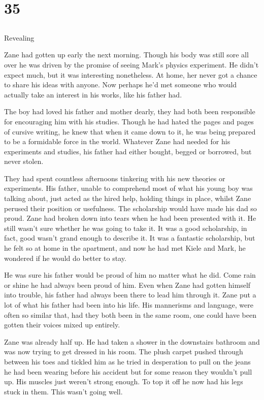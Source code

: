 \chapter{35}
\section{}
Revealing  

Zane had gotten up early the next morning.  Though his body was still sore all over he was driven by the promise of seeing Mark's physics experiment.  He didn't expect much, but it was interesting nonetheless.  At home, her never got a chance to share his ideas with anyone.  Now perhaps he'd met someone who would actually take an interest in his works, like his father had.

The boy had loved his father and mother dearly, they had both been responsible for encouraging him with his studies.  Though he had hated the pages and pages of cursive writing, he knew that when it came down to it, he was being prepared to be a formidable force in the world.  Whatever Zane had needed for his experiments and studies, his father had either bought, begged or borrowed, but never stolen.

They had spent countless afternoons tinkering with his new theories or experiments.  His father, unable to comprehend most of what his young boy was talking about, just acted as the hired help, holding things in place, whilst Zane perused their position or usefulness.  The scholarship would have made his dad so proud.  Zane had broken down into tears when he had been presented with it.  He still wasn't sure whether he was going to take it.  It was a good scholarship, in fact, good wasn't grand enough to describe it.  It was a fantastic scholarship, but he felt so at home in the apartment, and now he had met Kiele and Mark, he wondered if he would do better to stay.

He was sure his father would be proud of him no matter what he did.  Come rain or shine he had always been proud of him.  Even when Zane had gotten himself into trouble, his father had always been there to lead him through it.  Zane put a lot of what his father had been into his life.  His mannerisms and language, were often so similar that, had they both been in the same room, one could have been gotten their voices mixed up entirely.

Zane was already half up.  He had taken a shower in the downstairs bathroom and was now trying to get dressed in his room.  The plush carpet pushed through between his toes and tickled him as he tried in desperation to pull on the jeans he had been wearing before his accident but for some reason they wouldn't pull up.  His muscles just weren't strong enough.  To top it off he now had his legs stuck in them.  This wasn't going well.


